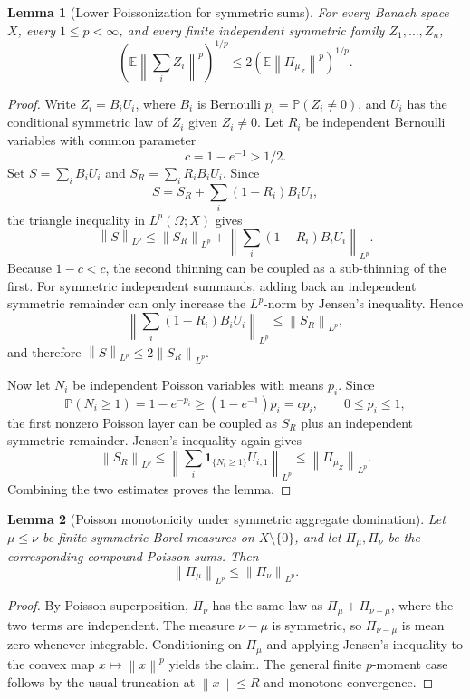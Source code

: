 \documentclass[11pt]{article}
\newtheorem{lemma}{Lemma}
\newcommand{\E}{\mathbb E}
\newcommand{\Pp}{\mathbb P}
\newcommand{\norm}[1]{\left\lVert #1\right\rVert}
\begin{document}
\begin{lemma}[Lower Poissonization for symmetric sums]
\label{lem:lower}
For every Banach space \(X\), every \(1\le p<\infty\), and every finite
independent symmetric family \(Z_1,\ldots,Z_n\),
\[
  \left(\E\norm{\sum_i Z_i}^p\right)^{1/p}
  \le
  2
  \left(\E\norm{\Pi_{\mu_Z}}^p\right)^{1/p}.
\]
\end{lemma}

\begin{proof}
Write \(Z_i=B_iU_i\), where \(B_i\) is Bernoulli \(p_i=\Pp(Z_i\ne0)\), and
\(U_i\) has the conditional symmetric law of \(Z_i\) given \(Z_i\ne0\).  Let
\(R_i\) be independent Bernoulli variables with common parameter
\[
  c=1-e^{-1}>1/2.
\]
Set \(S=\sum_i B_iU_i\) and \(S_R=\sum_i R_iB_iU_i\).  Since
\[
  S=S_R+\sum_i(1-R_i)B_iU_i,
\]
the triangle inequality in \(L^p(\Omega;X)\) gives
\[
  \norm{S}_{L^p}
  \le
  \norm{S_R}_{L^p}
  +
  \left\|\sum_i(1-R_i)B_iU_i\right\|_{L^p}.
\]
Because \(1-c<c\), the second thinning can be coupled as a sub-thinning of
the first.  For symmetric independent summands, adding back an independent
symmetric remainder can only increase the \(L^p\)-norm by Jensen's inequality.
Hence
\[
  \left\|\sum_i(1-R_i)B_iU_i\right\|_{L^p}\le \norm{S_R}_{L^p},
\]
and therefore \(\norm{S}_{L^p}\le2\norm{S_R}_{L^p}\).

Now let \(N_i\) be independent Poisson variables with means \(p_i\).  Since
\[
  \Pp(N_i\ge1)=1-e^{-p_i}\ge (1-e^{-1})p_i=cp_i,
  \qquad 0\le p_i\le1,
\]
the first nonzero Poisson layer can be coupled as \(S_R\) plus an independent
symmetric remainder.  Jensen's inequality again gives
\[
  \norm{S_R}_{L^p}
  \le
  \left\|\sum_i \mathbf 1_{\{N_i\ge1\}}U_{i,1}\right\|_{L^p}
  \le
  \norm{\Pi_{\mu_Z}}_{L^p}.
\]
Combining the two estimates proves the lemma.
\end{proof}

\begin{lemma}[Poisson monotonicity under symmetric aggregate domination]
\label{lem:monotone}
Let \(\mu\le\nu\) be finite symmetric Borel measures on \(X\setminus\{0\}\),
and let \(\Pi_\mu,\Pi_\nu\) be the corresponding compound-Poisson sums.  Then
\[
  \norm{\Pi_\mu}_{L^p}\le \norm{\Pi_\nu}_{L^p}.
\]
\end{lemma}

\begin{proof}
By Poisson superposition, \(\Pi_\nu\) has the same law as
\(\Pi_\mu+\Pi_{\nu-\mu}\), where the two terms are independent.  The measure
\(\nu-\mu\) is symmetric, so \(\Pi_{\nu-\mu}\) is mean zero whenever integrable.
Conditioning on \(\Pi_\mu\) and applying Jensen's inequality to the convex map
\(x\mapsto\norm{x}^p\) yields the claim.  The general finite \(p\)-moment case
follows by the usual truncation at \(\norm{x}\le R\) and monotone convergence.
\end{proof}
\end{document}
